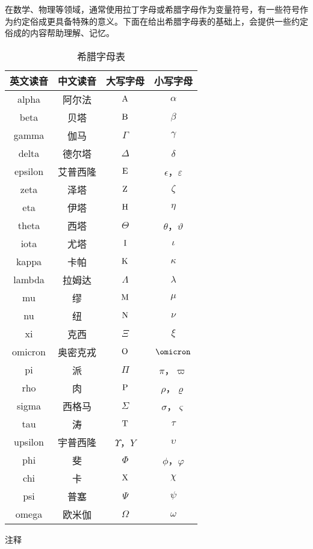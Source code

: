 \begin{issues}
\issueDraft
\end{issues}
在数学、物理等领域，通常使用拉丁字母或希腊字母作为变量符号，有一些符号作为约定俗成更具备特殊的意义。下面在给出希腊字母表的基础上，会提供一些约定俗成的内容帮助理解、记忆。

\begin{table}[ht]
\centering
\caption{希腊字母表}\label{tab_GreekL1}
\begin{tabular}{|c|c|c|c|}
\hline
英文读音 & 中文读音 & 大写字母 & 小写字母 \\
\hline
alpha & 阿尔法 & ${\rm A}$ & $\alpha$ \\
\hline
beta & 贝塔 & ${\rm B}$ & $\beta$ \\
\hline
gamma & 伽马 & $\Gamma$ & $\gamma$ \\
\hline
delta & 德尔塔 &$\Delta$ & $\delta$ \\
\hline
epsilon & 艾普西隆 & ${\rm E}$ & $\epsilon$，$\varepsilon$ \\
\hline
zeta & 泽塔 & ${\rm Z}$ & $\zeta$ \\
\hline
eta & 伊塔 & ${\rm H}$ & $\eta$ \\
\hline
theta & 西塔 & $\Theta$ & $\theta$，$\vartheta$ \\
\hline
iota & 尤塔 & ${\rm I}$ & $\iota$ \\
\hline
kappa & 卡帕 & ${\rm K}$ & $\kappa$ \\
\hline
lambda & 拉姆达 &$\Lambda$ & $\lambda$ \\
\hline
mu & 缪 & ${\rm M}$ & $\mu$ \\
\hline
nu & 纽 & ${\rm N}$ & $\nu$ \\
\hline
xi & 克西 &$\Xi$ & $\xi$ \\
\hline
omicron & 奥密克戎 & ${\rm O}$ & $\omicron$ \\
\hline
pi & 派 &$\Pi$ & $\pi$，$\varpi$ \\
\hline
rho & 肉 & ${\rm P}$ & $\rho$，$\varrho$ \\
\hline
sigma & 西格马 &$\Sigma$ & $\sigma$，$\varsigma$ \\
\hline
tau & 涛 & ${\rm T}$ & $\tau$ \\
\hline
upsilon & 宇普西隆 & $\Upsilon$，${Y}$ & $\upsilon$ \\
\hline
phi & 斐 &$\Phi$ & $\phi$，$\varphi$ \\
\hline
chi & 卡 & ${\rm X}$ & $\chi$ \\
\hline
psi & 普塞 & $\Psi$ & $\psi$ \\
\hline
omega & 欧米伽 & $\Omega$ & $\omega$ \\
\hline
\end{tabular}
\end{table}

注释


